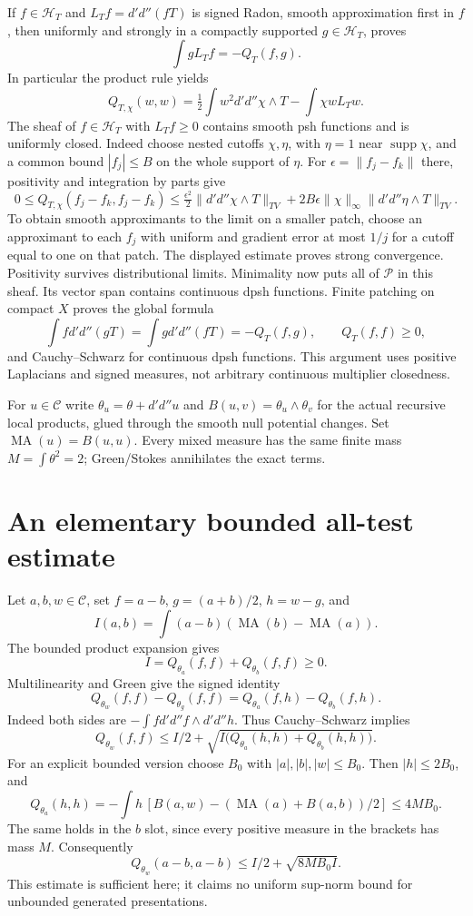 \documentclass[11pt]{article}
\newcommand{\DD}{d'd''}
\newcommand{\MA}{\operatorname{MA}}
\begin{document}
If $f\in\mathscr H_T$ and $L_Tf=\DD(fT)$ is signed Radon, smooth
approximation first in $f$, then uniformly and strongly in a compactly
supported $g\in\mathscr H_T$, proves
\[
 \int gL_Tf=-Q_T(f,g).
\]
In particular the product rule yields
\[
 Q_{T,\chi}(w,w)
 =\tfrac12\int w^2\DD\chi\wedge T-\int\chi w L_Tw.
\]
The sheaf of $f\in\mathscr H_T$ with $L_Tf\ge0$ contains smooth psh
functions and is uniformly closed. Indeed choose nested cutoffs
$\chi,\eta$, with $\eta=1$ near $\operatorname{supp}\chi$, and a common
bound $|f_j|\le B$ on the whole support of $\eta$. For
$\epsilon=\|f_j-f_k\|$ there, positivity and integration by parts give
\[
 0\le Q_{T,\chi}(f_j-f_k,f_j-f_k)
 \le\tfrac{\epsilon^2}{2}\|\DD\chi\wedge T\|_{TV}
 +2B\epsilon\|\chi\|_\infty\|\DD\eta\wedge T\|_{TV}.
\]
To obtain smooth approximants to the limit on a smaller patch, choose
an approximant to each $f_j$ with uniform and gradient error at most
$1/j$ for a cutoff equal to one on that patch. The displayed estimate
proves strong convergence. Positivity survives distributional limits.
Minimality now puts all of $\mathscr P$ in this sheaf. Its vector span
contains continuous dpsh functions. Finite patching on compact $X$
proves the global formula
\[
 \int f\DD(gT)=\int g\DD(fT)=-Q_T(f,g),
 \qquad Q_T(f,f)\ge0,
\]
and Cauchy--Schwarz for continuous dpsh functions. This argument uses
positive Laplacians and signed measures, not arbitrary continuous
multiplier closedness.

For $u\in\mathcal C$ write $\theta_u=\theta+\DD u$ and
$B(u,v)=\theta_u\wedge\theta_v$ for the actual recursive local
products, glued through the smooth null potential changes.
Set $\MA(u)=B(u,u)$. Every mixed measure has the same finite mass
$M=\int\theta^2=2$; Green/Stokes annihilates the exact terms.

\section{An elementary bounded all-test estimate}
Let $a,b,w\in\mathcal C$, set $f=a-b$, $g=(a+b)/2$, $h=w-g$, and
\[
 I(a,b)=\int(a-b)(\MA(b)-\MA(a)).
\]
The bounded product expansion gives
\[
 I=Q_{\theta_a}(f,f)+Q_{\theta_b}(f,f)\ge0.
\]
Multilinearity and Green give the signed identity
\[
 Q_{\theta_w}(f,f)-Q_{\theta_g}(f,f)
 =Q_{\theta_a}(f,h)-Q_{\theta_b}(f,h).
\]
Indeed both sides are $-\int f\DD f\wedge\DD h$.
Thus Cauchy--Schwarz implies
\[
 Q_{\theta_w}(f,f)\le I/2+
 \sqrt{I\bigl(Q_{\theta_a}(h,h)+Q_{\theta_b}(h,h)\bigr)}.
\]
For an explicit bounded version choose $B_0$ with
$|a|,|b|,|w|\le B_0$. Then $|h|\le2B_0$, and
\[
 Q_{\theta_a}(h,h)
 =-\int h\,[B(a,w)-(\MA(a)+B(a,b))/2]
 \le4MB_0.
\]
The same holds in the $b$ slot, since every positive measure in the
brackets has mass $M$. Consequently
\[
 Q_{\theta_w}(a-b,a-b)\le I/2+\sqrt{8MB_0I}.
\]
This estimate is sufficient here; it claims no uniform sup-norm bound
for unbounded generated presentations.
\end{document}
